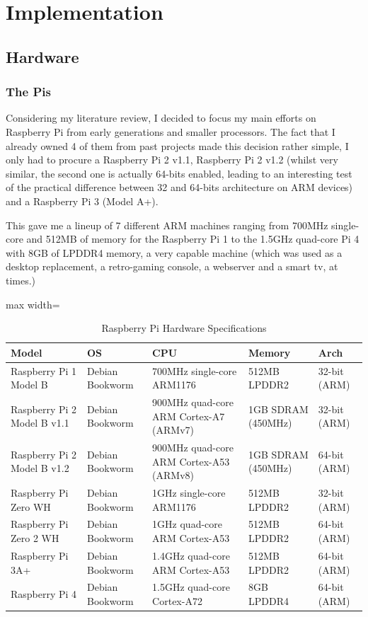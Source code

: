 \documentclass[11pt, letterpaper]{article}
\begin{document}
\section{Implementation}
\subsection{Hardware}
\subsubsection{The Pis}
Considering my literature review, I decided to focus my main efforts on Raspberry Pi from early generations and smaller processors. The fact that I already owned 4 of them from past projects made this decision rather simple, I only had to procure a Raspberry Pi 2 v1.1, Raspberry Pi 2 v1.2 (whilst very similar, the second one is actually 64-bits enabled, leading to an interesting test of the practical difference between 32 and 64-bits architecture on ARM devices) and a Raspberry Pi 3 (Model A+).

This gave me a lineup of 7 different ARM machines ranging from 700MHz single-core and 512MB of memory for the Raspberry Pi 1 to the 1.5GHz quad-core Pi 4 with 8GB of LPDDR4 memory, a very capable machine (which was used as a desktop replacement, a retro-gaming console, a webserver and a smart tv, at times.)

\begin{table}[h]
\centering
\caption{Raspberry Pi Hardware Specifications}
\label{tab:raspberry-pi-specs}
\begin{adjustbox}{max width=\textwidth}
\begin{tabular}{|l|l|l|l|l|}
\hline
\textbf{Model} & \textbf{OS} & \textbf{CPU} & \textbf{Memory} & \textbf{Arch} \\
\hline
Raspberry Pi 1 Model B & Debian Bookworm & 700MHz single-core ARM1176 & 512MB LPDDR2 & 32-bit (ARM) \\
\hline
Raspberry Pi 2 Model B v1.1 & Debian Bookworm & 900MHz quad-core ARM Cortex-A7 (ARMv7) & 1GB SDRAM (450MHz) & 32-bit (ARM) \\
\hline
Raspberry Pi 2 Model B v1.2 & Debian Bookworm & 900MHz quad-core ARM Cortex-A53 (ARMv8) & 1GB SDRAM (450MHz) & 64-bit (ARM) \\
\hline
Raspberry Pi Zero WH & Debian Bookworm & 1GHz single-core ARM1176 & 512MB LPDDR2 & 32-bit (ARM) \\
\hline
Raspberry Pi Zero 2 WH & Debian Bookworm & 1GHz quad-core ARM Cortex-A53 & 512MB LPDDR2 & 64-bit (ARM) \\
\hline
Raspberry Pi 3A+ & Debian Bookworm & 1.4GHz quad-core ARM Cortex-A53 & 512MB LPDDR2 & 64-bit (ARM) \\
\hline
Raspberry Pi 4 & Debian Bookworm & 1.5GHz quad-core Cortex-A72 & 8GB LPDDR4 & 64-bit (ARM) \\
\hline
\end{tabular}
\end{adjustbox}
\end{table}
\end{document}
